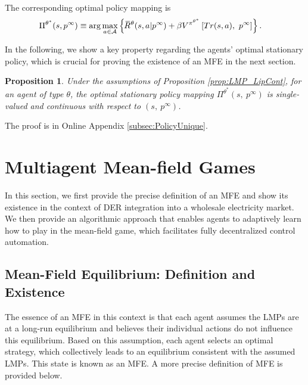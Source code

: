 \documentclass{article}
\theoremstyle{definition}
\theoremstyle{plain}
\newtheorem{proposition}{Proposition}
\newcommand{\overbar}[1]{\mkern1.5mu\overline{\mkern-3.0mu#1\mkern-1mu}\mkern 1.5mu}
\begin{document}
The corresponding optimal policy mapping is  
\begin{align}
& \Pi^{\theta^*}(s, p^{\infty}) \equiv   \arg\max_{a\in\mathcal{A}} \left\{\overbar{R}^{\theta}(s, a|p^{\infty}) + \beta  V^{\pi^{\theta^*}}\left[Tr(s,a),\ p^{\infty}\right]\right\}. \label{eq:OptPolicy}
\end{align}

In the following, we show a key property regarding the agents' optimal stationary policy, which is crucial for proving the existence of an MFE in the next section.



\begin{proposition}
	Under the assumptions of Proposition \ref{prop:LMP_LipCont}, for an agent of type $\theta$, the optimal stationary policy mapping $\Pi^{\theta^*}(s,\ p^{\infty})$ is single-valued and continuous  with respect to $(s,\ p^{\infty})$. 
	\label{prop:unique}
\end{proposition}
The proof is in Online Appendix \ref{subsec:PolicyUnique}.

\section{Multiagent Mean-field Games}
\label{sec:MFG}
In this section, we first provide the precise definition of an MFE and show its existence in the context of DER integration into a wholesale electricity market. We then provide an algorithmic approach that enables agents to adaptively learn how to play in the mean-field game, which facilitates fully decentralized control automation.

\subsection{Mean-Field Equilibrium: Definition and Existence}

The essence of an MFE in this context is that each agent assumes the LMPs are at a long-run equilibrium and believes their individual actions do not influence this equilibrium. Based on this assumption, each agent selects an optimal strategy, which collectively leads to an equilibrium consistent with the assumed LMPs. This state is known as an MFE. A more precise definition of MFE is provided below.
\end{document}
